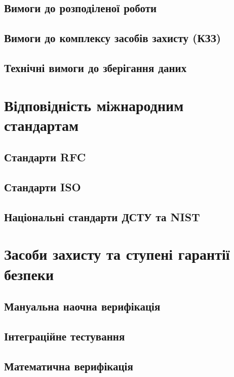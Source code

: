 \subsection{Вимоги до розподіленої роботи}

\subsection{Вимоги до комплексу засобів захисту (КЗЗ)}

\subsection{Технічні вимоги до зберігання даних}

\section{Відповідність міжнародним стандартам}

\subsection{Стандарти RFC}

\subsection{Стандарти ISO}

\subsection{Національні стандарти ДСТУ та NIST}

\section{Засоби захисту та ступені гарантії безпеки}

\subsection{Мануальна наочна верифікація}

\subsection{Інтеграційне тестування}

\subsection{Математична верифікація}

